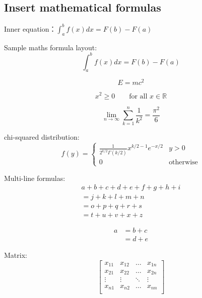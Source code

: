 \documentclass[12pt,hyperref,a4paper,UTF8]{ctexart}
\begin{document}
\subsection{Insert mathematical formulas}
Inner equation：$\int_a^b f(x)dx = F(b)-F(a)$

Sample maths formula layout:
\begin{equation}\label{eq:1}
    \int_a^b f(x)dx = F(b)-F(a)
\end{equation}

\begin{equation}\label{eq:2}
    E = mc^2
\end{equation}

\begin{equation}\label{eq:3}
    x^2 \geq 0 \qquad \text{for all } x \in \mathbb{R}
\end{equation}

\begin{equation}\label{eq:4}
    \lim_{n \to \infty}
    \sum_{k=1}^n \frac{1}{k^2}
    = \frac{\pi^2}{6}
\end{equation}

chi-squared distribution:
\begin{equation}\label{eq:5}
    f(y) =
    \begin{cases}
        \frac{1}{2^{k/2}\Gamma(k/2)} x^{k/2-1} e^{-x/2} & y>0              \\
        0                                               & \text{otherwise}
    \end{cases}
\end{equation}

Multi-line formulas:
\begin{multline} \label{eq:6}
    a + b + c + d + e + f
    + g + h + i \\
    = j + k + l + m + n\\
    = o + p + q + r + s\\
    = t + u + v + x + z
\end{multline}

\begin{align} \label{eq:7}
    a & = b + c \\
      & = d + e
\end{align}

Matrix:
\begin{equation} \label{eq:8}
    \begin{bmatrix}
        x_{11} & x_{12} & \ldots & x_{1n} \\
        x_{21} & x_{22} & \ldots & x_{2n} \\
        \vdots & \vdots & \ddots & \vdots \\
        x_{n1} & x_{n2} & \ldots & x_{nn} \\
    \end{bmatrix}
\end{equation}
\end{document}
